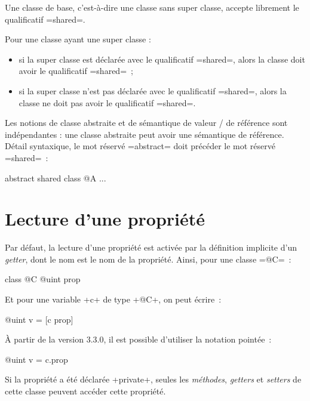 Une classe de base, c'est-à-dire une classe sans super classe, accepte librement le qualificatif \ggs=shared=.

Pour une classe ayant une super classe :
\begin{itemize}
  \item si la super classe est déclarée avec le qualificatif \ggs=shared=, alors la classe doit avoir le qualificatif \ggs=shared=~;
  \item si la super classe n'est pas déclarée avec le qualificatif \ggs=shared=, alors la classe ne doit pas avoir le qualificatif \ggs=shared=.
\end{itemize}

Les notions de classe abstraite et de sémantique de valeur / de référence sont indépendantes : une classe abstraite peut avoir une sémantique de référence. Détail syntaxique, le mot réservé \ggs=abstract= doit précéder le mot réservé \ggs=shared=~:

abstract shared class @A {
  ...
}








\section{Lecture d'une propriété}

Par défaut, la lecture d'une propriété est activée par la définition implicite d'un \emph{getter}, dont le nom est le nom de la propriété. Ainsi, pour une classe \ggs=@C=~:

\begin{galgas}
class @C {
  @uint prop
}
\end{galgas}

Et pour une variable \ggs+c+ de type \ggs+@C+, on peut écrire~:

\begin{galgas}
@uint v = [c prop]
\end{galgas}

À partir de la version 3.3.0, il est possible d'utiliser la notation pointée~:
\begin{galgas}
@uint v = c.prop
\end{galgas}

Si la propriété a été déclarée \ggs+private+, seules les \emph{méthodes}, \emph{getters} et \emph{setters} de cette classe peuvent accéder cette propriété.








